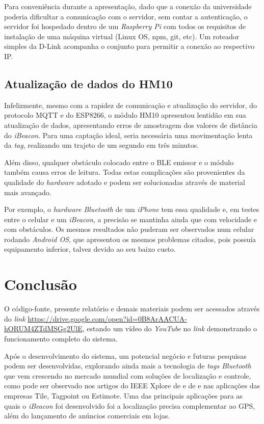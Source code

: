 \documentclass[
	12pt,				%
	openright,			%
	twoside,			%
	a4paper,			%
	english,			%
	french,				%
	spanish,			%
	brazil				%
	]{abntex2}
\begin{document}
Para conveniência durante a apresentação, dado que a conexão da universidade poderia dificultar a comunicação com o servidor, sem contar a autenticação, o servidor foi hospedado dentro de um \textit{Raspberry Pi} com todos os requisitos de instalação de uma máquina virtual (Linux OS, npm, git, etc). Um roteador simples da D-Link acompanha o conjunto para permitir a conexão ao respectivo IP.

\section{Atualização de dados do HM10}

Infelizmente, mesmo com a rapidez de comunicação e atualização do servidor, do protocolo MQTT e do ESP8266, o módulo HM10 apresentou lentidão em sua atualização de dados, apresentando erros de amostragem dos valores de distância do \textit{iBeacon}. Para uma captação ideal, seria necessária uma movimentação lenta da \textit{tag}, realizando um trajeto de um segundo em três minutos. 

Além disso, qualquer obstáculo colocado entre o BLE emissor e o módulo também causa erros de leitura. Todas estas complicações são provenientes da qualidade do \textit{hardware} adotado e podem ser solucionadas através de material mais avançado. 

Por exemplo, o \textit{hardware Bluetooth} de um \textit{iPhone} tem essa qualidade e, em testes entre o celular e um \textit{iBeacon}, a precisão se mantinha ainda que com velocidade e com obstáculos. Os mesmos resultados não puderam ser observados num celular rodando \textit{Android OS}, que apresentou os mesmos problemas citados, pois possuía equipamento inferior, talvez devido ao seu baixo custo.

\chapter{Conclusão}

O código-fonte, presente relatório e demais materiais podem ser acessados através do \textit{link} \url{https://drive.google.com/open?id=0B8ArAACUA-hORUM4ZTdMSGg2UlE}, estando um vídeo do \textit{YouTube} no \textit{link} \url{} demonstrando o funcionamento completo do sistema.

Após o desenvolvimento do sistema, um potencial negócio e futuras pesquisas podem ser desenvolvidas, explorando ainda mais a tecnologia de \textit{tags Bluetooth} que vem crescendo no mercado mundial com soluções de localização e controle, como pode ser observado nos artigos do IEEE Xplore de  e de  e nas aplicações das empresas Tile, Tagpoint ou Estimote. Uma das principais aplicações para as quais o \textit{iBeacon} foi desenvolvido foi a localização precisa complementar ao GPS, além do lançamento de anúncios comerciais em lojas.
\end{document}
